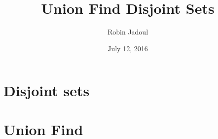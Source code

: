 \documentclass{beamer}
\title{Union Find Disjoint Sets}
\author{Robin Jadoul}
\date{July 12, 2016}
\institute
{
    \texttt{[image: ../share/beoi-logo.png]}
}
\begin{document}
\frame{\titlepage}

\section[Disjoint sets]{Disjoint sets}


\section[Union Find]{Union Find}

\end{document}

